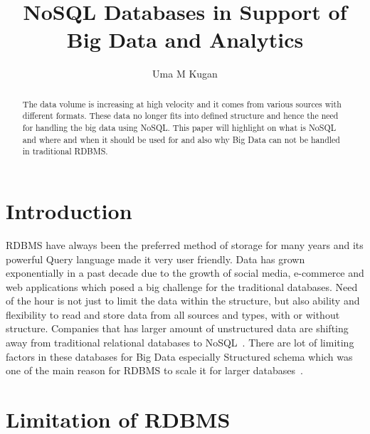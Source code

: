 
\title{NoSQL Databases in Support of Big Data and Analytics}

\author{Uma M Kugan}
\renewcommand{\shortauthors}{Uma Kugan}

\begin{abstract}
The data volume is increasing at high velocity and it comes from various
sources with different formats. These data no longer fits into defined
structure and hence the need for handling the big data using NoSQL. 
This paper will highlight on what is NoSQL and where and when it should
be used for and also why Big Data can not be handled in traditional RDBMS.
\end{abstract}



\maketitle

\section{Introduction}

RDBMS have always been the preferred method of storage for many years
and its powerful Query language made it very user friendly. Data has
grown exponentially in a past decade due to the growth of social media,
e-commerce and web applications which posed a big challenge for the 
traditional databases. Need of the hour is not just to limit the data
within the structure, but also ability and flexibility to read and store
data from all sources and types, with or without structure. Companies
that has larger amount of unstructured data are shifting away from 
traditional relational databases to NoSQL~\cite{hid-sp18-710-neal}. There are lot of
limiting factors in these databases for Big Data especially Structured
schema which was one of the main reason for RDBMS to scale it for larger
databases~\cite{hid-sp18-710-aspire}.

\section{Limitation of RDBMS}

